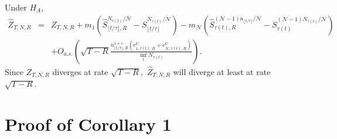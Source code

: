 Under $H_{A},$%
\begin{eqnarray*}
\widehat{Z}_{T,N,R} &=&Z_{T,N,R}+m_{1}\left( \widehat{S}_{\lfloor t/\tau
\rfloor ,R}^{N_{\tau(t)}/\mathcal{N}}-S_{\lfloor t/\tau
\rfloor }^{N_{\tau(t)}/\mathcal{N}}\right) -m_{\mathcal{N}%
}\left( \widehat{S}_{\tau(t),R}^{(\mathcal{N-}1)n_{\lfloor
t/\tau \rfloor }/\mathcal{N}}-S_{\tau(t)}^{(\mathcal{N-}%
1)N_{\tau(t)}/\mathcal{N}}\right)  \\
&&+O_{a.s.}\left( \sqrt{T-R}\frac{n_{\lfloor t/\tau \rfloor
,R}^{1+\varepsilon }\left( c_{1,\tau(t),R}^{U}+c_{\mathcal{N}%
,\tau(t),R}^{U}\right) }{\inf_{t}N_{\tau(t)}}%
\right) .
\end{eqnarray*}%
Since $Z_{T,N,R}$ diverges at rate $\sqrt{T-R},$ $\widehat{Z}_{T,N,R}$ will
diverge at least at rate $\sqrt{T-R}.$

\section{Proof of Corollary 1}
\label{Proof of cor:error}

